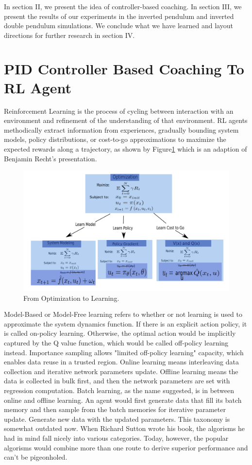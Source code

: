 \documentclass[smallextended]{svjour3}
\begin{document}
In section II, we present the idea of controller-based coaching. In section III, we present the results of our experiments in the inverted pendulum and inverted double pendulum simulations. We conclude what we have learned and layout directions for further research in section IV.

\section{PID Controller Based Coaching To RL Agent}

Reinforcement Learning is the process of cycling between interaction with an environment and refinement of the understanding of that environment. RL agents methodically extract information from experiences, gradually bounding system models, policy distributions, or cost-to-go approximations to maximize the expected rewards along a trajectory, as shown by Figure\ref{fig:rl} which is an adaption of Benjamin Recht's presentation\cite{Recht2018ATO}. 

\begin{figure}
    \centering
    \includegraphics[width=\textwidth]{Control.png}
    \caption{From Optimization to Learning.}
    \label{fig:rl}
\end{figure} 

Model-Based or Model-Free learning refers to whether or not learning is used to approximate the system dynamics function. If there is an explicit action policy, it is called on-policy learning. Otherwise, the optimal action would be implicitly captured by the Q value function, which would be called off-policy learning instead. Importance sampling allows "limited off-policy learning" capacity, which enables data reuse in a trusted region. Online learning means interleaving data collection and iterative network parameters update. Offline learning means the data is collected in bulk first, and then the network parameters are set with regression computation. Batch learning, as the name suggested, is in between online and offline learning. An agent would first generate data that fill its batch memory and then sample from the batch memories for iterative parameter update. Generate new data with the updated parameters. This taxonomy is somewhat outdated now. When Richard Sutton wrote his book\cite{Sutton1998IntroductionTR}, the algorisms he had in mind fall nicely into various categories. Today, however, the popular algorisms would combine more than one route to derive superior performance and can't be pigeonholed.
\end{document}
